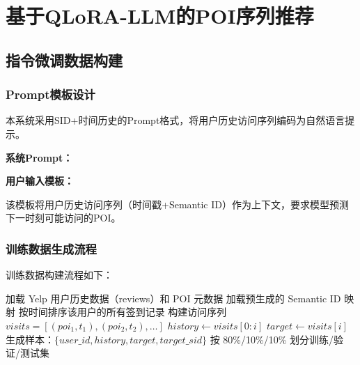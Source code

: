 \chapter{基于QLoRA-LLM的POI序列推荐}
\label{chap:qlora_llm}

\section{指令微调数据构建}
\label{sec:instruction_data}

\subsection{Prompt模板设计}
\label{sec:prompt_template}

本系统采用SID+时间历史的Prompt格式，将用户历史访问序列编码为自然语言提示。

\noindent\textbf{系统Prompt：}

\vspace{0.5ex}

\noindent\textbf{用户输入模板：}

该模板将用户历史访问序列（时间戳+Semantic ID）作为上下文，要求模型预测下一时刻可能访问的POI。

\subsection{训练数据生成流程}
\label{sec:data_generation}

训练数据构建流程如下：

\begin{algorithm}[htbp]
\caption{指令微调数据构建}
\label{alg:data_build}
\begin{algorithmic}[1]
\State 加载 Yelp 用户历史数据（reviews）和 POI 元数据
\State 加载预生成的 Semantic ID 映射
    \State 按时间排序该用户的所有签到记录
    \State 构建访问序列 $visits = [(poi_1, t_1), (poi_2, t_2), \dots]$
        \State $history \gets visits[0:i]$  
        \State $target \gets visits[i]$  
        \State 生成样本：$\{user\_id, history, target, target\_sid\}$
    \EndFor
\EndFor
\State 按 80\%/10\%/10\% 划分训练/验证/测试集
\end{algorithmic}
\end{algorithm}

